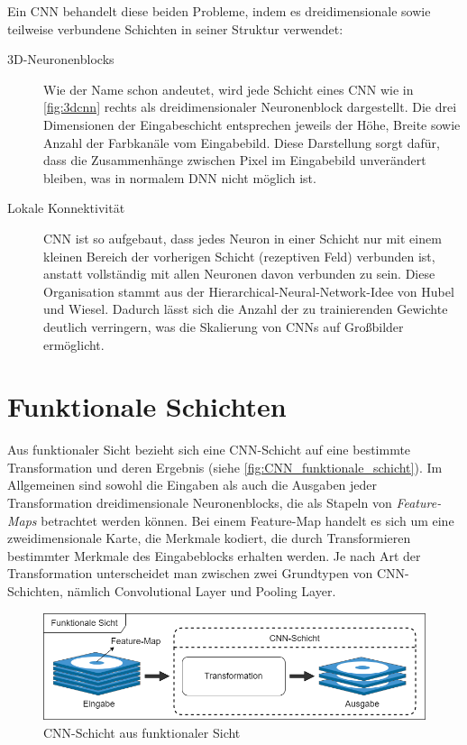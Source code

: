 Ein CNN behandelt diese beiden Probleme, indem es dreidimensionale sowie teilweise verbundene Schichten in seiner Struktur verwendet:

\begin{description}
	\item[3D-Neuronenblocks]
	
	Wie der Name schon andeutet, wird jede Schicht eines CNN wie in \autoref{fig:3dcnn} rechts als dreidimensionaler Neuronenblock dargestellt. Die drei Dimensionen der Eingabeschicht entsprechen jeweils der Höhe, Breite sowie Anzahl der Farbkanäle vom Eingabebild. Diese Darstellung sorgt dafür, dass die Zusammenhänge zwischen Pixel im Eingabebild unverändert bleiben, was in normalem DNN nicht möglich ist.

	\item[Lokale Konnektivität]
	
	CNN ist so aufgebaut, dass jedes Neuron in einer Schicht nur mit einem kleinen Bereich der vorherigen Schicht (rezeptiven Feld) verbunden ist, anstatt vollständig mit allen Neuronen davon verbunden zu sein. Diese Organisation stammt aus der Hierarchical-Neural-Network-Idee von Hubel und Wiesel. Dadurch lässt sich die Anzahl der zu trainierenden Gewichte deutlich verringern, was die Skalierung von CNNs auf Großbilder ermöglicht.
	
\end{description}

\section{Funktionale Schichten} \label{sec:CNN-Funktionale_Schichten}

Aus funktionaler Sicht bezieht sich eine CNN-Schicht auf eine bestimmte Transformation und deren Ergebnis (siehe \autoref{fig:CNN_funktionale_schicht}). Im Allgemeinen sind sowohl die Eingaben als auch die Ausgaben jeder Transformation dreidimensionale Neuronenblocks, die als Stapeln von \emph{Feature-Maps} betrachtet werden können. Bei einem Feature-Map handelt es sich um eine zweidimensionale Karte, die Merkmale kodiert, die durch Transformieren bestimmter Merkmale des Eingabeblocks erhalten werden. Je nach Art der Transformation unterscheidet man zwischen zwei Grundtypen von CNN-Schichten, nämlich Convolutional Layer und Pooling Layer.

\begin{figure}[!hb]
	\centering
	\includegraphics[width=\linewidth]{images/CNN_funktionale_schicht}
	\caption{CNN-Schicht aus funktionaler Sicht}
	\label{fig:CNN_funktionale_schicht}
\end{figure}

